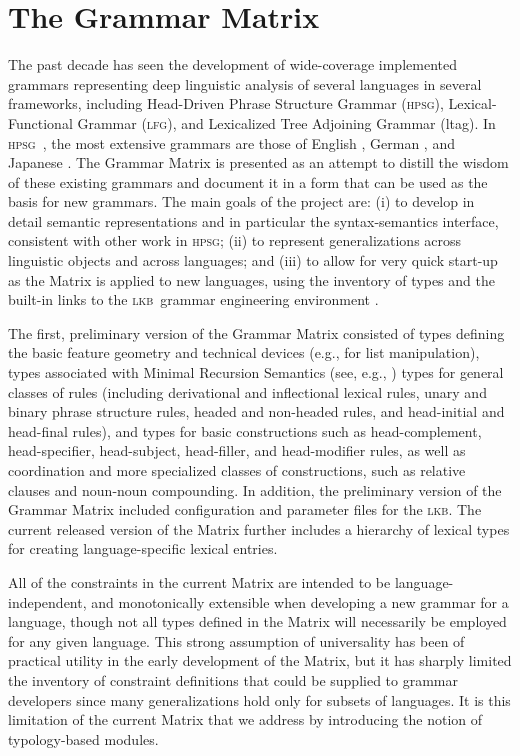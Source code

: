\documentclass[11pt]{article}
\newcommand{\hpsg}{\textsc{hpsg}}
\newcommand{\lkb}{\textsc{lkb}}
\newcommand{\lfg}{\textsc{lfg}}
\begin{document}
\section{The Grammar Matrix}

The past decade has seen the development of wide-coverage implemented
grammars representing deep linguistic analysis of several languages in
several frameworks, including Head-Driven Phrase Structure Grammar
(\hpsg), Lexical-Functional Grammar (\lfg), and Lexicalized Tree
Adjoining Grammar ({\sc ltag}). In \hpsg\ \cite{Pol:Sag:94}, the most
extensive grammars are those of English \cite{Flickinger:00}, German
\cite{Mue:Kap:00}, and Japanese \cite{Siegel:00,Siegel:Bender:02}.
The Grammar Matrix \cite{Ben:Fli:Oe:02} is presented as 
an attempt to distill the
wisdom of these existing grammars and document it in a form that can
be used as the basis for new grammars. The main goals of the project
are: (i) to develop in detail semantic representations and in particular 
the syntax-semantics interface, consistent with other work in \hpsg; 
(ii) to represent generalizations across linguistic objects
and across languages; and (iii) to allow for very quick start-up as 
the Matrix is applied to new languages, using the inventory of types and
the built-in links to the \lkb\ grammar engineering environment
\cite{Copestake:02}.

The first, preliminary version of the Grammar Matrix 
consisted of types defining the basic feature geometry and technical
devices (e.g., for list manipulation), types associated with Minimal
Recursion Semantics (see, e.g., \cite{Cop:Las:Fli:01}) types for
general classes of rules (including derivational and inflectional
lexical rules, unary and binary phrase structure rules, headed and
non-headed rules, and head-initial and head-final rules), and types
for basic constructions such as head-complement, head-specifier,
head-subject, head-filler, and head-modifier rules, as well as 
coordination and more specialized classes of constructions, such as relative
clauses and noun-noun compounding.  In addition, the preliminary
version of the Grammar Matrix included configuration and parameter
files for the \lkb.  The current released version of the Matrix further 
includes a hierarchy of lexical types for creating language-specific 
lexical entries.

All of the constraints in the current Matrix are intended to be 
language-independent, and monotonically extensible when developing a
new grammar for a language, though not all types defined in the Matrix
will necessarily be employed for any given language.  This strong 
assumption of universality has been of practical utility in the early
development of the Matrix, but it has sharply limited the inventory of
constraint definitions that could be supplied to grammar developers
since many generalizations hold only for subsets of languages.  It is
this limitation of the current Matrix that we address by introducing
the notion of typology-based modules.
\end{document}
